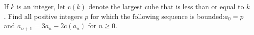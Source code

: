If $k$ is an integer, let $\mathrm{c}(k)$ denote the largest cube that is less than or equal to $k$. Find all positive integers $p$ for which the following sequence is bounded:$a_0 = p$ and $a_{n+1} = 3a_n-2\mathrm{c}(a_n)$ for $n \geqslant 0$.